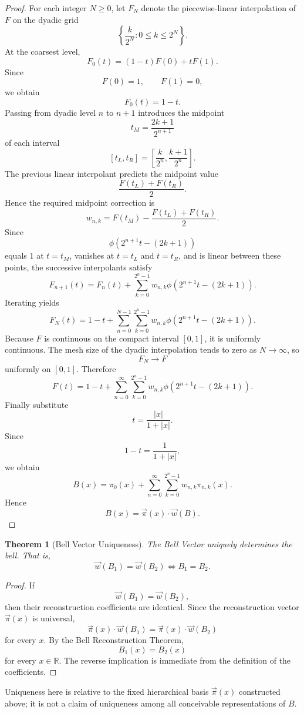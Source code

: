 \documentclass[11pt]{article}
\theoremstyle{definition}
\theoremstyle{plain}
\newtheorem{theorem}[definition]{Theorem}
\theoremstyle{remark}
\begin{document}
\begin{proof}
For each integer $N\ge 0$, let $F_N$ denote the piecewise-linear interpolation of $F$ on the dyadic grid
\[
\left\{
\frac{k}{2^N}:0\le k\le 2^N
\right\}.
\]
At the coarsest level,
\[
F_0(t)
=
(1-t)F(0)+tF(1).
\]
Since
\[
F(0)=1,
\qquad
F(1)=0,
\]
we obtain
\[
F_0(t)=1-t.
\]
Passing from dyadic level $n$ to $n+1$ introduces the midpoint
\[
t_M=\frac{2k+1}{2^{n+1}}
\]
of each interval
\[
[t_L,t_R]
=
\left[
\frac{k}{2^n},
\frac{k+1}{2^n}
\right].
\]
The previous linear interpolant predicts the midpoint value
\[
\frac{F(t_L)+F(t_R)}{2}.
\]
Hence the required midpoint correction is
\[
w_{n,k}
=
F(t_M)
-
\frac{F(t_L)+F(t_R)}{2}.
\]
Since
\[
\phi\!\left(2^{n+1}t-(2k+1)\right)
\]
equals $1$ at $t=t_M$, vanishes at $t=t_L$ and $t=t_R$, and is linear between these points, the successive interpolants satisfy
\[
F_{n+1}(t)
=
F_n(t)
+
\sum_{k=0}^{2^n-1}
w_{n,k}
\phi\!\left(
2^{n+1}t-(2k+1)
\right).
\]
Iterating yields
\[
F_N(t)
=
1-t
+
\sum_{n=0}^{N-1}
\sum_{k=0}^{2^n-1}
w_{n,k}
\phi\!\left(
2^{n+1}t-(2k+1)
\right).
\]
Because $F$ is continuous on the compact interval $[0,1]$, it is uniformly continuous. The mesh size of the dyadic interpolation tends to zero as $N\to\infty$, so
\[
F_N\to F
\]
uniformly on $[0,1]$.
Therefore
\[
F(t)
=
1-t
+
\sum_{n=0}^{\infty}
\sum_{k=0}^{2^n-1}
w_{n,k}
\phi\!\left(
2^{n+1}t-(2k+1)
\right).
\]
Finally substitute
\[
t=\frac{|x|}{1+|x|}.
\]
Since
\[
1-t=\frac{1}{1+|x|},
\]
we obtain
\[
B(x)
=
\pi_0(x)
+
\sum_{n=0}^{\infty}
\sum_{k=0}^{2^n-1}
w_{n,k}\pi_{n,k}(x).
\]
Hence
\[
\boxed{
B(x)=\vec{\pi}(x)\cdot\vec{w}(B).
}
\]
\end{proof}
\begin{theorem}[Bell Vector Uniqueness]\label{thm:bellvectoruniqueness}
The Bell Vector uniquely determines the bell. That is,
\[
\boxed{
\vec{w}(B_1)=\vec{w}(B_2)
\iff
B_1=B_2.
}
\]
\end{theorem}
\begin{proof}
If
\[
\vec{w}(B_1)=\vec{w}(B_2),
\]
then their reconstruction coefficients are identical. Since the reconstruction vector $\vec{\pi}(x)$ is universal,
\[
\vec{\pi}(x)\cdot\vec{w}(B_1)
=
\vec{\pi}(x)\cdot\vec{w}(B_2)
\]
for every $x$. By the Bell Reconstruction Theorem,
\[
B_1(x)=B_2(x)
\]
for every $x\in\mathbb{R}$.
The reverse implication is immediate from the definition of the coefficients.
\end{proof}
Uniqueness here is relative to the fixed hierarchical basis $\vec\pi(x)$ constructed
above; it is not a claim of uniqueness among all conceivable representations of $B$.
\end{document}
